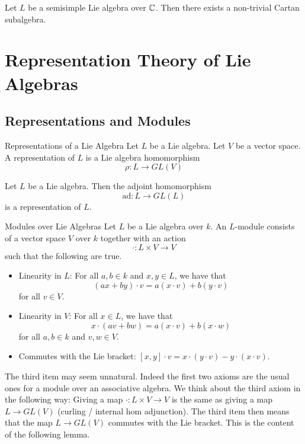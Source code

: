 \documentclass[a4paper]{article}
\begin{document}
\begin{lmm}{}{} Let $L$ be a semisimple Lie algebra over $\mathbb{C}$. Then there exists a non-trivial Cartan subalgebra. 
\end{lmm}

\pagebreak
\section{Representation Theory of Lie Algebras}
\subsection{Representations and Modules}
\begin{defn}{Representations of a Lie Algebra}{} Let $L$ be a Lie algebra. Let $V$ be a vector space. A representation of $L$ is a Lie algebra homomorphism $$\rho:L\to GL(V)$$
\end{defn}

\begin{lmm}{}{} Let $L$ be a Lie algebra. Then the adjoint homomorphism $$\text{ad}:L\to GL(L)$$ is a representation of $L$. 
\end{lmm}

\begin{defn}{Modules over Lie Algebras}{} Let $L$ be a Lie algebra over $k$. An $L$-module consists of a vector space $V$ over $k$ together with an action $$\cdot:L\times V\to V$$ such that the following are true. 
\begin{itemize}
\item Linearity in $L$: For all $a,b\in k$ and $x,y\in L$, we have that $$(ax+by)\cdot v=a(x\cdot v)+b(y\cdot v)$$ for all $v\in V$. 
\item Linearity in $V$: For all $x\in L$, we have that $$x\cdot(av+bw)=a(x\cdot v)+b(x\cdot w)$$ for all $a,b\in k$ and $v,w\in V$. 
\item Commutes with the Lie bracket: $[x,y]\cdot v=x\cdot(y\cdot v)-y\cdot(x\cdot v)$. 
\end{itemize}
\end{defn}

The third item may seem unnatural. Indeed the first two axioms are the usual ones for a module over an associative algebra. We think about the third axiom in the following way: Giving a map $\cdot:L\times V\to V$ is the same as giving a map $L\to GL(V)$ (curling / internal hom adjunction). The third item then means that the map $L\to GL(V)$ commutes with the Lie bracket. This is the content of the following lemma. 
\end{document}
